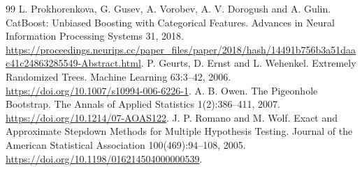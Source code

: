 \documentclass[11pt]{article}
\begin{document}
\begin{thebibliography}{99}
 L. Prokhorenkova, G. Gusev, A. Vorobev, A. V. Dorogush and A. Gulin.
CatBoost: Unbiased Boosting with Categorical Features.
Advances in Neural Information Processing Systems 31, 2018.
\url{https://proceedings.neurips.cc/paper_files/paper/2018/hash/14491b756b3a51daac41c24863285549-Abstract.html}.
 P. Geurts, D. Ernst and L. Wehenkel.
Extremely Randomized Trees. Machine Learning 63:3--42, 2006.
\url{https://doi.org/10.1007/s10994-006-6226-1}.
 A. B. Owen. The Pigeonhole Bootstrap.
The Annals of Applied Statistics 1(2):386--411, 2007.
\url{https://doi.org/10.1214/07-AOAS122}.
 J. P. Romano and M. Wolf. Exact and Approximate Stepdown
Methods for Multiple Hypothesis Testing. Journal of the American Statistical
Association 100(469):94--108, 2005.
\url{https://doi.org/10.1198/016214504000000539}.
\end{thebibliography}
\end{document}
